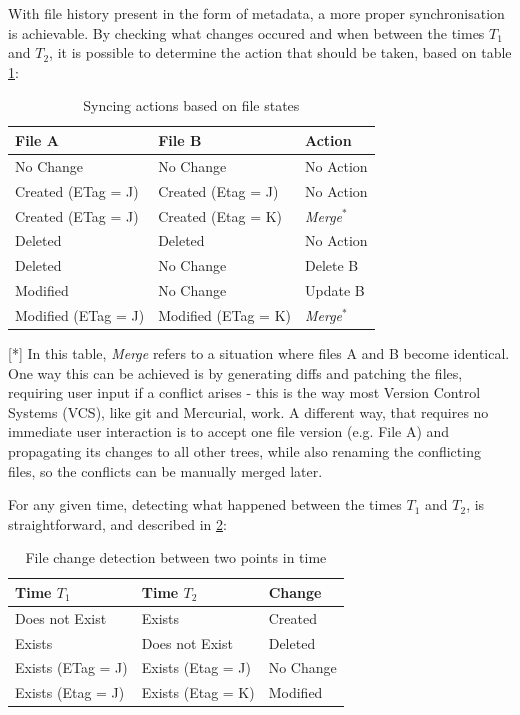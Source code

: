     With file history present in the form of metadata, a more proper synchronisation is achievable. By checking what changes occured and when between the times $T_1$ and $T_2$, it is possible to determine the action that should be taken, based on table \ref{table:simple-sync-actions}:\\

    \begin{table}[H]
      \centering
      \begin{tabular}{|l|l|l|}
        \hline \textbf{File A} & \textbf{File B} & \textbf{Action} \\ \hline \hline
         No Change & No Change & No Action \\ \hline
         Created (ETag = J) & Created (Etag = J) & No Action \\ \hline
         Created (ETag = J) & Created (Etag = K) & \emph{Merge$^*$} \\ \hline
         Deleted & Deleted & No Action \\ \hline
         Deleted & No Change & Delete B \\ \hline
         Modified & No Change & Update B \\ \hline
         Modified (ETag = J) & Modified (ETag = K) & \emph{Merge$^*$} \\ \hline
      \end{tabular}
      \caption{Syncing actions based on file states}
      \label{table:simple-sync-actions}
    \end{table}

    [*] In this table, \emph{Merge} refers to a situation where files A and B become identical. One way this can be achieved is by generating diffs and patching the files, requiring user input if a conflict arises - this is the way most Version Control Systems (VCS), like git and Mercurial, work. A different way, that requires no immediate user interaction is to accept one file version (e.g. File A) and propagating its changes to all other trees, while also renaming the conflicting files, so the conflicts can be manually merged later.

    For any given time, detecting what happened between the times $T_1$ and $T_2$, is straightforward, and described in \ref{table:time-change-detection}:\\

    \begin{table}[H]
      \centering
      \begin{tabular}{|l|l|l|}
        \hline \textbf{Time $T_1$} & \textbf{Time $T_2$} & \textbf{Change}\\ \hline \hline
         Does not Exist & Exists & Created \\ \hline
         Exists & Does not Exist & Deleted \\ \hline
         Exists (ETag = J) & Exists (Etag = J) & No Change \\ \hline
         Exists (Etag = J) & Exists (Etag = K) & Modified \\ \hline
      \end{tabular}
    \caption{File change detection between two points in time}
    \label{table:time-change-detection}
    \end{table}

